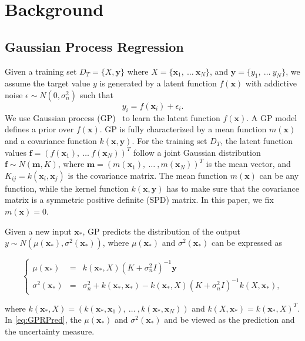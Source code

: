 \section{Background}

\subsection{Gaussian Process Regression}\label{sec:SOGP}

Given a training set $D_T = \{X, \bm{y}\}$ where $X = \{\bm{x}_1,~\dots~\bm{x}_N\}$, and $\bm{y} = \{y_1,~\dots~y_N\}$, we assume the target value $y$ is generated
by a latent function $f(\bm{x})$ with addictive noise $\epsilon \sim N(0, \sigma_n^2)$ such that
\begin{equation}
    \label{eq:yf}
    y_i = f(\bm{x}_i) + \epsilon_i.
\end{equation}
We use Gaussian process (GP)~\cite{GPML} to learn the latent function $f(\bm{x})$. A GP model defines a prior over $f(\bm{x})$. GP is fully characterized by a mean function $m(\bm{x})$ and a covariance function $k(\bm{x}, \bm{y})$. For the training set $D_T$, the latent function values $\bm{f} = (f(\bm{x}_1),~\dots~f(\bm{x}_N))^T$ follow a joint Gaussian distribution $\bm{f} \sim N(\bm{m}, K)$, where $\bm{m} = (m(\bm{x}_1),~\dots~,m(\bm{x}_N))^T$ is the mean vector, and $K_{ij} = k(\bm{x}_i, \bm{x}_j)$ is the covariance matrix. The mean function $m(\bm{x})$ can be any function, while the kernel function $k(\bm{x}, \bm{y})$ has to make sure that the covariance matrix is a symmetric positive definite (SPD) matrix. In this paper, we fix $m(\bm{x}) = 0$.

Given a new input $\bm{x}_*$, GP predicts the distribution of the output $y \sim N(\mu(\bm{x}_*), \sigma^2(\bm{x}_*))$, where $\mu(\bm{x}_*)$ and $\sigma^2(\bm{x}_*)$ can be expressed as

\begin{equation}
    \left\{
        \begin{array}{lll}
            \mu(\bm{x}_*)      &=& k(\bm{x}_*, X) (K + \sigma_n^2 I)^{-1} \bm{y} \\
            \sigma^2(\bm{x}_*) &=& \sigma_n^2 + k(\bm{x}_*, \bm{x}_*) - k(\bm{x}_*, X) (K + \sigma_n^2 I)^{-1} k(X, \bm{x}_*),
        \end{array}
    \right.
    \label{eq:GPRPred}
\end{equation}

where $k(\bm{x}_*, X) = (k(\bm{x}_*, \bm{x}_1),~\dots~,k(\bm{x}_*, \bm{x}_N))$ and $k(X, \bm{x}_*) = k(\bm{x}_*, X)^T$. In \eqref{eq:GPRPred}, the $\mu(\bm{x}_*)$ and $\sigma^2(\bm{x}_*)$ and be viewed as the prediction and the uncertainty measure.

